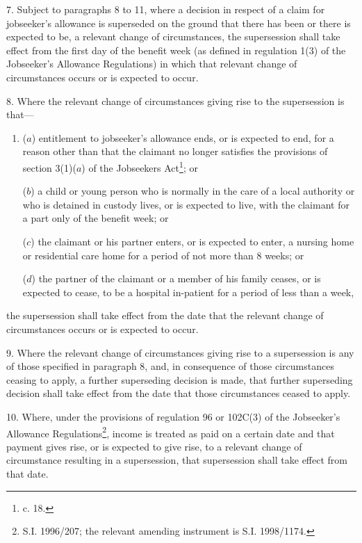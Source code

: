 \documentclass[12pt,a4paper]{article}
\begin{document}
7.  Subject to paragraphs 8 to 11, where a decision in respect of a claim for jobseeker’s allowance is superseded on the ground that there has been or there is expected to be, a relevant change of circumstances, the supersession shall take effect from the first day of the benefit week (as defined in regulation 1(3) of the Jobseeker’s Allowance Regulations) in which that relevant change of circumstances occurs or is expected to occur.

\medskip

8.  Where the relevant change of circumstances giving rise to the supersession is that—
\begin{enumerate}\item[]
($a$) entitlement to jobseeker’s allowance ends, or is expected to end, for a reason other than that the claimant no longer satisfies the provisions of section 3(1)($a$)  of the Jobseekers Act\footnote{ c. 18.}; or

($b$) a child or young person who is normally in the care of a local authority or who is detained in custody lives, or is expected to live, with the claimant for a part only of the benefit week; or

($c$) the claimant or his partner enters, or is expected to enter, a nursing home or residential care home for a period of not more than 8 weeks; or

($d$) the partner of the claimant or a member of his family ceases, or is expected to cease, to be a hospital in-patient for a period of less than a week,
\end{enumerate}
the supersession shall take effect from the date that the relevant change of circumstances occurs or is expected to occur.

\medskip

9.  Where the relevant change of circumstances giving rise to a supersession is any of those specified in paragraph 8, and, in consequence of those circumstances ceasing to apply, a further superseding decision is made, that further superseding decision shall take effect from the date that those circumstances ceased to apply.

\medskip

10.  Where, under the provisions of regulation 96 or 102C(3) of the Jobseeker’s Allowance Regulations\footnote{\frenchspacing S.I. 1996/207; the relevant amending instrument is S.I. 1998/1174.}, income is treated as paid on a certain date and that payment gives rise, or is expected to give rise, to a relevant change of circumstance resulting in a supersession, that supersession shall take effect from that date.
\end{document}
